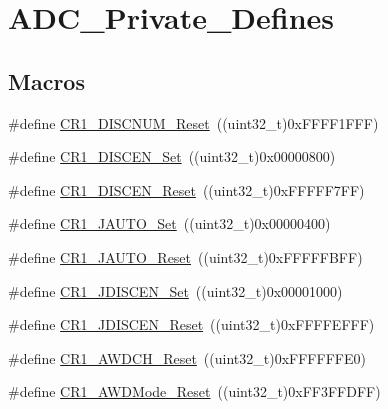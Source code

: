 \hypertarget{group___a_d_c___private___defines}{}\section{A\+D\+C\+\_\+\+Private\+\_\+\+Defines}
\label{group___a_d_c___private___defines}
\subsection*{Macros}
\begin{DoxyCompactItemize}
\item 
\#define \mbox{\hyperlink{group___a_d_c___private___defines_ga88cecf0c336d950115d7a52d599de816}{C\+R1\+\_\+\+D\+I\+S\+C\+N\+U\+M\+\_\+\+Reset}}~((uint32\+\_\+t)0x\+F\+F\+F\+F1\+F\+F\+F)
\item 
\#define \mbox{\hyperlink{group___a_d_c___private___defines_ga95f4f653adde3407c116919c2b7d9c74}{C\+R1\+\_\+\+D\+I\+S\+C\+E\+N\+\_\+\+Set}}~((uint32\+\_\+t)0x00000800)
\item 
\#define \mbox{\hyperlink{group___a_d_c___private___defines_ga959f617e77853bff85ca5e8d6fba6611}{C\+R1\+\_\+\+D\+I\+S\+C\+E\+N\+\_\+\+Reset}}~((uint32\+\_\+t)0x\+F\+F\+F\+F\+F7\+F\+F)
\item 
\#define \mbox{\hyperlink{group___a_d_c___private___defines_gaa8478f12e212738e249a7fafb69d4dd4}{C\+R1\+\_\+\+J\+A\+U\+T\+O\+\_\+\+Set}}~((uint32\+\_\+t)0x00000400)
\item 
\#define \mbox{\hyperlink{group___a_d_c___private___defines_gab6c4a9f0a661bf7c5add35ea3a90b756}{C\+R1\+\_\+\+J\+A\+U\+T\+O\+\_\+\+Reset}}~((uint32\+\_\+t)0x\+F\+F\+F\+F\+F\+B\+F\+F)
\item 
\#define \mbox{\hyperlink{group___a_d_c___private___defines_gafef4d16c890bf5e6eb381ad01c829309}{C\+R1\+\_\+\+J\+D\+I\+S\+C\+E\+N\+\_\+\+Set}}~((uint32\+\_\+t)0x00001000)
\item 
\#define \mbox{\hyperlink{group___a_d_c___private___defines_gab6ffba92495342bd5f0a8b1fa216526b}{C\+R1\+\_\+\+J\+D\+I\+S\+C\+E\+N\+\_\+\+Reset}}~((uint32\+\_\+t)0x\+F\+F\+F\+F\+E\+F\+F\+F)
\item 
\#define \mbox{\hyperlink{group___a_d_c___private___defines_gabe7e68383d281e58707a1cd749a3374e}{C\+R1\+\_\+\+A\+W\+D\+C\+H\+\_\+\+Reset}}~((uint32\+\_\+t)0x\+F\+F\+F\+F\+F\+F\+E0)
\item 
\#define \mbox{\hyperlink{group___a_d_c___private___defines_gae53703f0c718ecc5b3e1a69c60af3697}{C\+R1\+\_\+\+A\+W\+D\+Mode\+\_\+\+Reset}}~((uint32\+\_\+t)0x\+F\+F3\+F\+F\+D\+F\+F)

\end{DoxyCompactItemize}
